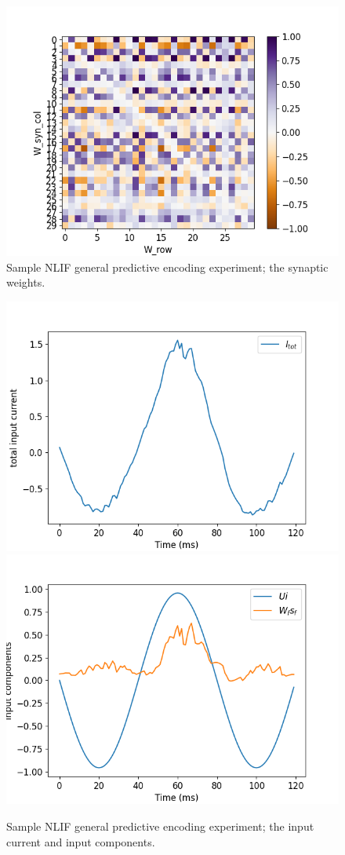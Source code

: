 \documentclass[mphil,deptreport,ianc]{infthesis} %
\begin{document}
\begin{figure}[!h]
    \centering
    \includegraphics[width=0.6\columnwidth]{figures/Supplementary/gating/NLIF/General/01-04_16-42-32-911/test_heatmap_W.png}
    \caption{Sample NLIF general predictive encoding experiment; the synaptic weights.}
    \label{fig:NLIF_GPE_1_W_syn}
\end{figure}


\begin{figure}[!h]
    \centering
    \includegraphics[width=0.49\columnwidth]{figures/Supplementary/gating/NLIF/General/01-04_16-42-32-911/test_plot_I_tot_NLIF_seed_23.png}
    \includegraphics[width=0.49\columnwidth]{figures/Supplementary/gating/NLIF/General/01-04_16-42-32-911/test_plot_input_components_NLIF_seed_23.png}
    \caption{Sample NLIF general predictive encoding experiment; the input current and input components.}
    \label{fig:NLIF_GPE_1_I_tot_in_comp}
\end{figure}
\end{document}
